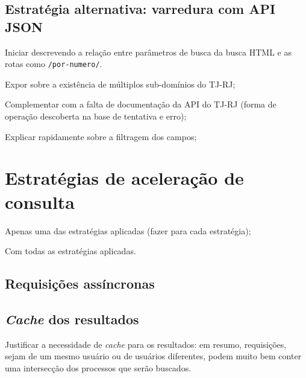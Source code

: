 \subsection{Estratégia alternativa: varredura com API JSON}

\begin{todolist}
    \item Iniciar descrevendo a relação entre parâmetros de busca da busca HTML
          e as rotas como \texttt{/por-numero/}.
    \item Expor sobre a existência de múltiplos sub-domínios do TJ-RJ;
    \item Complementar com a falta de documentação da API do TJ-RJ (forma de
          operação descoberta na base de tentativa e erro);
    \item Explicar rapidamente sobre a filtragem dos campos;
\end{todolist}

\section{Estratégias de aceleração de consulta}


\begin{todolist}
    \item Apenas uma das estratégias aplicadas (fazer para cada estratégia);
    \item Com todas as estratégias aplicadas.
\end{todolist}

\subsection{Requisições assíncronas}

\subsection{\textit{Cache} dos resultados}

\begin{todolist}
    \item Justificar a necessidade de \textit{cache} para os resultados: em
          resumo, requisições, sejam de um mesmo usuário ou de usuários
          diferentes, podem muito bem conter uma intersecção dos processos que
          serão buscados.
\end{todolist}
